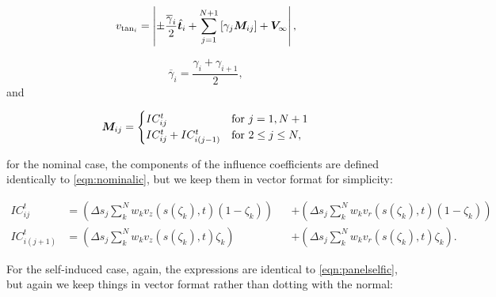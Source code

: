\begin{equation}
    v_{\text{tan}_i} = \left| \pm\frac{\overline{\gamma}_i}{2}\hat{\bm{t}}_i + \sum_{j=1}^{N+1} \left[\gamma_j\bm{M}_{ij}\right]  + \bm{V}_\infty \right|,
\end{equation}

\where

\begin{equation}
    \overline{\gamma}_i = \frac{\gamma_i + \gamma_{i+1}}{2},
\end{equation}
%
and

\begin{equation}
\vect{M}_{ij}=
    \begin{cases}
        IC^t_{ij}        \hfill & \text{for }j=1,N+1 \\
        IC^t_{ij} + IC^t_{i(j-1)} & \text{for }2 \leq j \leq N,
    \end{cases}
\end{equation}

\where for the nominal case, the components of the influence coefficients are defined identically to \cref{eqn:nominalic}, but we keep them in vector format for simplicity:

\begin{equation}
    \begin{alignedat}{2}
        IC^t_{ij} &= \left(\Delta s_j\sum_k^N  w_k v_z(s(\zeta_k),t) (1-\zeta_k)\right)  &&+ \left(\Delta s_j\sum_k^N w_k v_r(s(\zeta_k),t) (1-\zeta_k)\right) \\
        IC^t_{i(j+1)} &=  \left(\Delta s_j\sum_k^N w_k v_z(s(\zeta_k),t) \zeta_k\right)  &&+  \left(\Delta s_j\sum_k^N w_k v_r(s(\zeta_k),t) \zeta_k\right) .
    \end{alignedat}
\end{equation}

\noindent For the self-induced case, again, the expressions are identical to \cref{eqn:panelselfic},  but again we keep things in vector format rather than dotting with the normal:

